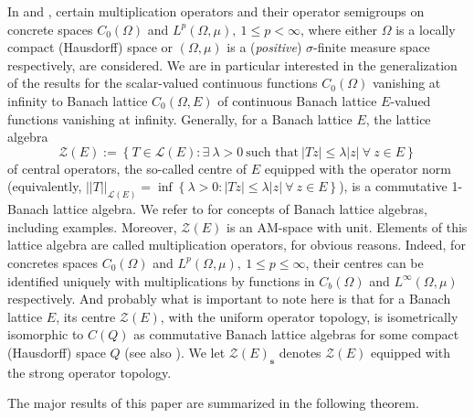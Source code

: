 \documentclass{article}
\newcommand{\Bm}[1]{ \boldsymbol{ #1 }}
\newcommand{\sL}{\mathscr{L}}
\newcommand{\mZ}{\mathcal{Z}}
\newcommand{\ty}{\infty}
\newcommand{\la}{\lambda}
\newcommand{\sig}{\sigma}
\newcommand{\Om}{\Omega}
\newcommand{\lb}{\left\lbrace}
\newcommand{\rb}{\right\rbrace }
\begin{document}
In \cite[Chapter I, section 3, p.19-29]{engel2006short}  and \cite[Chapter II, section 2, p.50]{engel2006short}, certain multiplication operators and their operator semigroups on concrete spaces $C_0(\Om)$ and $L^p(\Om, \mu),\ 1\le p<\ty$, where either $\Om$ is a locally compact (Hausdorff) space or $(\Om, \mu)$ is a (\textit{positive}) $\sig$-finite measure space respectively, are considered. We are in particular interested in the generalization of the results for the scalar-valued continuous  functions $C_0(\Om)$ vanishing at infinity to Banach lattice $C_0(\Om, E)$ of continuous  Banach lattice $E$-valued functions vanishing at infinity. 	
Generally, for a Banach lattice $E$, the lattice algebra
 \[\Bm{\mZ}(E):= \lb T\in \sL(E) : \exists\   \la> 0 \ \text{such that} \ \textbf{$|Tz|$} \le \la \textbf{$|z|$}\ \forall \ z\in E\rb\] 
of central operators, the so-called centre of $E$ equipped with the operator norm (equivalently, $||T||_{\sL(E)}= \inf\lb \la> 0 :\textbf{$|Tz|$} \le \la \textbf{$|z|$}\ \forall \ z\in E\rb $), is a commutative 1-Banach lattice algebra. We refer to \cite{wickstead17} for concepts of Banach lattice algebras, including examples. Moreover, $\Bm{\mZ}(E)$ is an AM-space with unit. Elements of this lattice algebra are called multiplication operators, for obvious reasons. Indeed, for concretes spaces $C_0(\Om)$ and $L^p(\Om, \mu),\ 1\le p\le\ty$, their centres can be identified uniquely with multiplications by functions in $C_b(\Om)$ and $L^\ty(\Om, \mu)$ respectively. And probably what is important to note here is that for a Banach lattice $E$, its centre $\Bm{\mZ}(E)$, with the uniform operator topology, is isometrically isomorphic to $C(Q)$ as commutative Banach lattice algebras for some compact (Hausdorff) space $Q$ (see also \cite[Section C-I.9, p.246]{arendt1986}). 
We let $\Bm{\mZ}(E)_\textbf{s}$ denotes $\Bm{\mZ}(E)$ equipped with the strong operator topology.

 \bigskip          

The major results of this paper are summarized in the following theorem.
\end{document}
